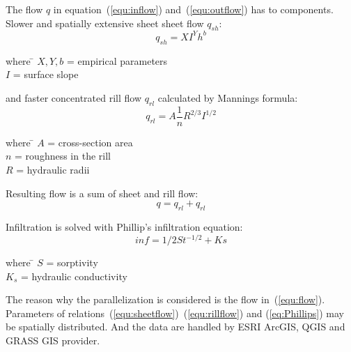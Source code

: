 The flow $q$ in equation~(\ref{equ:inflow}) and~(\ref{equ:outflow})
has to components. Slower and spatially extensive sheet sheet flow
$q_{sh}$:
\begin{equation}\label{equ:sheetflow}
    q_{sh} = XI^Yh^b
\end{equation}
\begin{tabbing} 
where \hspace{0.6cm} \= $X,Y,b$ = empirical parameters\\
\> $I$ = surface slope
\end{tabbing}
and faster concentrated rill flow $q_{rl}$ calculated by Mannings formula:
\begin{equation}\label{equ:rillflow}
    q_{rl} = A\frac{1}{n} R^{2/3} I^{1/2}
\end{equation}
\begin{tabbing} 
where \hspace{0.6cm} \= $A$ = cross-section area\\
\> $n$ = roughness in the rill\\
\> $R$ = hydraulic radii
\end{tabbing}
Resulting flow is a sum of sheet and rill flow:
\begin{equation}\label{equ:flow}
    q = q_{rl} + q_{rl}
\end{equation}

Infiltration is solved with Phillip's infiltration equation:
\begin{equation}\label{eq:Phillips}
    inf = 1/2St^{-1/2} + Ks
\end{equation}
\begin{tabbing} 
where \hspace{0.6cm} \= $S$ = sorptivity\\
\> $K_s$ = hydraulic conductivity
\end{tabbing}

The reason why the parallelization is considered is the flow
in~(\ref{equ:flow}). Parameters of
relations~(\ref{equ:sheetflow})~(\ref{equ:rillflow}) and
(\ref{eq:Phillips}) may be spatially distributed. And the data are
handled by ESRI ArcGIS, QGIS and GRASS GIS provider.







